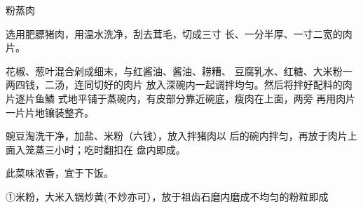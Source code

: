 \begin{recipe}{粉蒸肉}

\ingredients


\cooking

\step 选用肥膘猪肉，用温水洗净，刮去茸毛，切成三寸 长、一分半厚、一寸二宽的肉片。

\step 花椒、葱叶混合剁成细末，与红酱油、酱油、耢糟、 豆腐乳水、红糖、大米粉一两四钱，二汤，连同切好的肉片 放入深碗内一起调拌均匀。然后将拌好配料的肉片逐片鱼鱗 式地平铺于蒸碗内，有皮部分靠近碗底，瘦肉在上面，两旁 再用肉片一片片地镶装整齐。

\step 豌豆淘洗干净，加盐、米粉（六钱），放入拌猪肉以 后的碗内拌匀，再放于肉片上面入笼蒸三小时；吃时翻扣在 盘内即成。

\notes

此菜味浓香，宜于下饭。

①米粉，大米入锅炒黄(不炒亦可），放于祖齿石磨内磨成不均匀的粉粒即成

\end{recipe}

